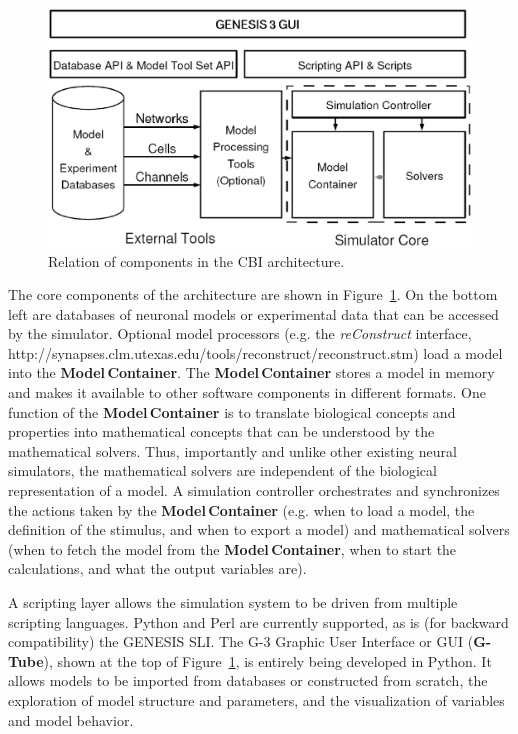 \documentclass[12pt]{article}
\begin{document}
\begin{figure}[ht]
  \centering
    \includegraphics[scale=0.4]{figures/G3arch.eps}
  \caption{Relation of components in the CBI architecture.}
  \label{fig:cbi-arch}
\end{figure}

The core components of the architecture are shown in
Figure~\ref{fig:cbi-arch}. On the bottom left are databases of
neuronal models or experimental data that can be accessed by the
simulator. Optional model processors (e.g. the {\it reConstruct} interface, http://synapses.clm.utexas.edu/tools/reconstruct/reconstruct.stm)
load a model into the {\bf Model\,Container}.  The {\bf
  Model\,Container} stores a model in memory and makes it available to
other software components in different formats.  One function of the
{\bf Model\,Container} is to translate biological concepts and
properties into mathematical concepts that can be understood by the
mathematical solvers. Thus, importantly and unlike other existing
neural simulators, the mathematical solvers are independent of the
biological representation of a model. A simulation controller
orchestrates and synchronizes the actions taken by the {\bf
  Model\,Container} (e.g. when to load a model, the definition of the
stimulus, and when to export a model) and mathematical solvers (when
to fetch the model from the {\bf Model\,Container}, when to start the
calculations, and what the output variables are).

A scripting layer allows the simulation system to be driven from
multiple scripting languages. Python and Perl are currently supported,
as is (for backward compatibility) the GENESIS SLI. The G-3 Graphic
User Interface or GUI ({\bf G-Tube}), shown at the top of
Figure~\ref{fig:cbi-arch}, is entirely being developed in Python.  It
allows models to be imported from databases or constructed from
scratch, the exploration of model structure and parameters, and the
visualization of variables and model behavior.
\end{document}
